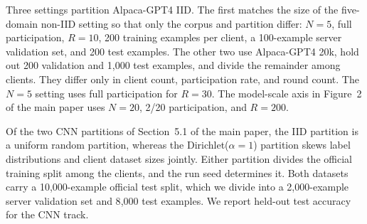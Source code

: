 \documentclass[letterpaper]{article} %
\theoremstyle{definition}
\begin{document}
Three settings partition Alpaca-GPT4 \citep{peng2023instruction} IID. The first
matches the size of the five-domain non-IID setting so that only the corpus and
partition differ: $N{=}5$, full participation, $R{=}10$, 200 training examples
per client, a 100-example server validation set, and 200 test examples. The
other two use Alpaca-GPT4 20k, hold out 200 validation and 1{,}000 test
examples, and divide the remainder among clients. They differ only in client
count, participation rate, and round count. The $N{=}5$ setting uses full
participation for $R{=}30$. The model-scale axis in Figure~2 of the main paper
uses $N{=}20$, 2/20 participation, and $R{=}200$.

Of the two CNN partitions of Section~5.1 of the main paper, the IID partition
is a uniform random partition, whereas the Dirichlet($\alpha{=}1$) partition
\citep{hsu2019measuring} skews label distributions and client dataset sizes
jointly. Either partition divides the official training split among the
clients, and the run seed determines it. Both datasets carry a
10{,}000-example official test split, which we divide into a 2{,}000-example
server validation set and 8{,}000 test examples. We report held-out test
accuracy for the CNN track.
\end{document}
